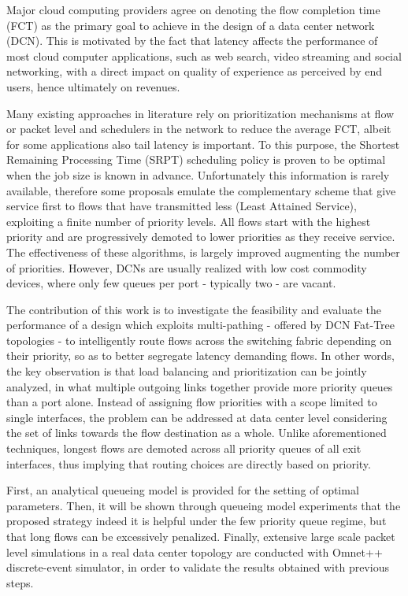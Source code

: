 \abstract
Major cloud computing providers agree on denoting the flow completion time (FCT) as the primary goal to achieve in the design of a data center network (DCN). This is motivated by the fact that latency affects the performance of most cloud computer applications, such as web search, video streaming and social networking, with a direct impact on quality of experience as perceived by end users, hence ultimately on revenues.

Many existing approaches in literature rely on prioritization mechanisms at flow or packet level and schedulers in the network to reduce the average FCT, albeit for some applications also tail latency is important. To this purpose, the Shortest Remaining Processing Time (SRPT) scheduling policy is proven to be optimal when the job size is known in advance. Unfortunately this information is rarely available, therefore some proposals emulate the complementary scheme that give service first to flows that have transmitted less (Least Attained Service), exploiting a finite number of priority levels. All flows start with the highest priority and are progressively demoted to lower priorities as they receive service. The effectiveness of these algorithms, is largely improved augmenting the number of priorities. However, DCNs are usually realized with low cost commodity devices, where only few queues per port - typically two - are vacant.

The contribution of this work is to investigate the feasibility and evaluate the performance of a design which exploits multi-pathing - offered by DCN Fat-Tree topologies - to intelligently route flows across the switching fabric depending on their priority, so as to better segregate latency demanding flows. In other words, the key observation is that load balancing and prioritization can be jointly analyzed, in what multiple outgoing links together provide more priority queues than a port alone. Instead of assigning flow priorities with a scope limited to single interfaces, the problem can be addressed at data center level considering the set of links towards the flow destination as a whole. Unlike aforementioned techniques, longest flows are demoted across all priority queues of all exit interfaces, thus implying that routing choices are directly based on priority.

First, an analytical queueing model is provided for the setting of optimal parameters. Then, it will be shown through queueing model experiments that the proposed strategy indeed it is helpful under the few priority queue regime, but that long flows can be excessively penalized. Finally, extensive large scale packet level simulations in a real data center topology are conducted with Omnet++ discrete-event simulator, in order to validate the results obtained with previous steps.